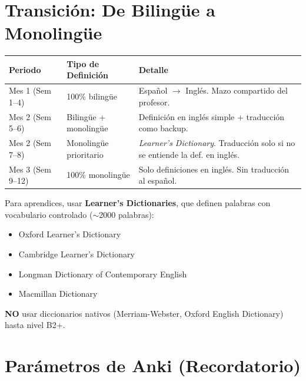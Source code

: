 \documentclass[12pt,a4paper]{article}
\begin{document}
\section{Transición: De Bilingüe a Monolingüe}

\begin{cajatransicion}
\begin{tabularx}{\textwidth}{@{} l l X @{}}
\toprule
\textbf{Periodo} & \textbf{Tipo de Definición} & \textbf{Detalle} \\
\midrule
Mes 1 (Sem 1--4) & 100\% bilingüe & Español $\rightarrow$ Inglés. Mazo compartido del profesor. \\
Mes 2 (Sem 5--6) & Bilingüe + monolingüe & Definición en inglés simple + traducción como backup. \\
Mes 2 (Sem 7--8) & Monolingüe prioritario & \textit{Learner's Dictionary}. Traducción solo si no se entiende la def. en inglés. \\
Mes 3 (Sem 9--12) & 100\% monolingüe & Solo definiciones en inglés. Sin traducción al español. \\
\bottomrule
\end{tabularx}

\medskip
\begin{cajaejemplo}
Para aprendices, usar \textbf{Learner's Dictionaries}, que definen palabras con vocabulario controlado ($\sim$2000 palabras):
\begin{itemize}[nosep, leftmargin=0.8cm]
  \item Oxford Learner's Dictionary
  \item Cambridge Learner's Dictionary
  \item Longman Dictionary of Contemporary English
  \item Macmillan Dictionary
\end{itemize}
\textbf{NO} usar diccionarios nativos (Merriam-Webster, Oxford English Dictionary) hasta nivel B2+.
\end{cajaejemplo}
\end{cajatransicion}

\section{Parámetros de Anki (Recordatorio)}
\end{document}
